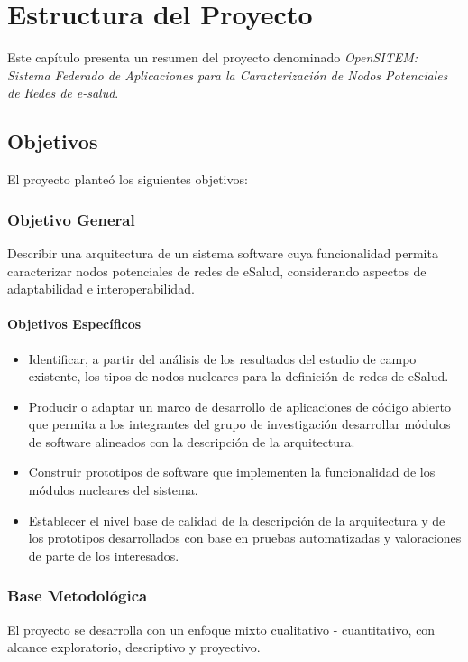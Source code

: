 \chapter{Estructura del Proyecto}

Este capítulo presenta un resumen del proyecto denominado \textit{OpenSITEM: Sistema Federado de Aplicaciones para la Caracterización de Nodos Potenciales de Redes de e-salud}.

\section{Objetivos}
El proyecto planteó los siguientes objetivos:

\subsection{Objetivo General}
Describir una arquitectura de un sistema software cuya funcionalidad permita caracterizar nodos potenciales de redes de eSalud, considerando aspectos de adaptabilidad e interoperabilidad.

\subsubsection{Objetivos Específicos}

\begin{itemize}
  \item Identificar, a partir del análisis de los resultados del estudio de campo existente, los tipos de nodos nucleares para la definición de redes de eSalud.
  \item Producir o adaptar un marco de desarrollo de aplicaciones de código abierto que permita a los integrantes del grupo de investigación desarrollar módulos de software alineados con la descripción de la arquitectura.
  \item Construir prototipos de software que implementen la funcionalidad de los módulos nucleares del sistema.
  \item Establecer el nivel base de calidad de la descripción de la arquitectura y de los prototipos desarrollados con base en pruebas automatizadas y valoraciones de parte de los interesados.
\end{itemize}

\subsection{Base Metodológica}
El proyecto se desarrolla con un enfoque mixto cualitativo - cuantitativo, con alcance exploratorio, descriptivo y proyectivo.


